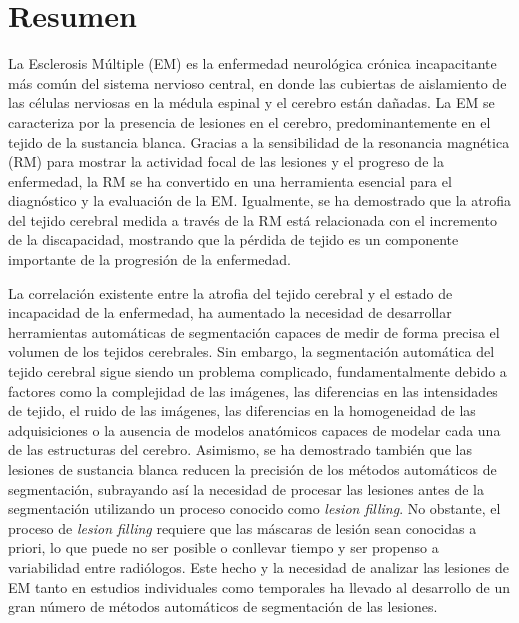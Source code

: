 \chapter*{Resumen}


La Esclerosis Múltiple (EM) es la enfermedad neurológica crónica incapacitante más común del sistema nervioso central, en donde las cubiertas de aislamiento de las células nerviosas en la médula espinal y el cerebro están dañadas. La EM se caracteriza por la presencia de lesiones en el cerebro, predominantemente en el tejido de la sustancia blanca. Gracias a la sensibilidad de la resonancia magnética (RM) para mostrar la actividad focal de las lesiones y el progreso de la enfermedad, la RM se ha convertido en una herramienta esencial para el diagnóstico y la evaluación de la EM. Igualmente, se ha demostrado que la atrofia del tejido cerebral medida a través de la RM está relacionada con el incremento de la discapacidad, mostrando que la pérdida de tejido es un componente importante de la progresión de la enfermedad.

La correlación existente entre la atrofia del tejido cerebral y el estado de incapacidad de la enfermedad, ha aumentado la necesidad de desarrollar 
herramientas automáticas de segmentación capaces de medir de forma precisa el volumen de los tejidos cerebrales. Sin embargo, la segmentación automática del tejido cerebral sigue siendo un problema complicado, fundamentalmente debido a factores como la complejidad de las imágenes, las diferencias en las intensidades de tejido, el ruido de las imágenes, las diferencias en la homogeneidad de las adquisiciones o la ausencia de modelos anatómicos capaces de modelar cada una de las estructuras del cerebro. Asimismo, se ha demostrado también que las lesiones de sustancia blanca reducen la precisión de los métodos automáticos de segmentación, subrayando así la necesidad de procesar las lesiones antes de la segmentación utilizando un proceso conocido como \textit{lesion filling}. No obstante, el proceso de \textit{lesion filling} requiere que las máscaras de lesión sean conocidas a priori, lo que puede no ser posible o conllevar tiempo y ser propenso a variabilidad entre radiólogos. Este hecho y la necesidad de analizar las lesiones de EM tanto en estudios individuales como temporales ha llevado al desarrollo de un 
gran número de métodos automáticos de segmentación de las lesiones. 

